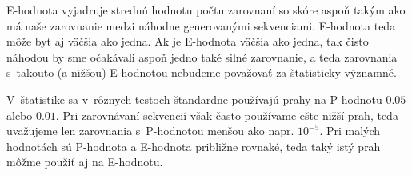 E-hodnota vyjadruje strednú hodnotu počtu zarovnaní so skóre aspoň takým ako má naše zarovnanie medzi náhodne generovanými sekvenciami. E-hodnota teda môže byť aj väčšia ako jedna. Ak je E-hodnota väčšia ako jedna, tak čisto náhodou by sme očakávali aspoň jedno také silné zarovnanie, a teda zarovnania s~takouto (a nižšou) E-hodnotou nebudeme považovať za štatisticky významné.

V~štatistike sa v~rôznych testoch štandardne používajú prahy na P-hodnotu $0.05$ alebo $0.01$.
Pri zarovnávaní sekvencií však často používame ešte nižší prah, teda uvažujeme len zarovnania s~P-hodnotou menšou ako napr. $10^{-5}$. Pri malých hodnotách sú P-hodnota a E-hodnota približne rovnaké, teda taký istý prah môžme použiť aj na E-hodnotu.
